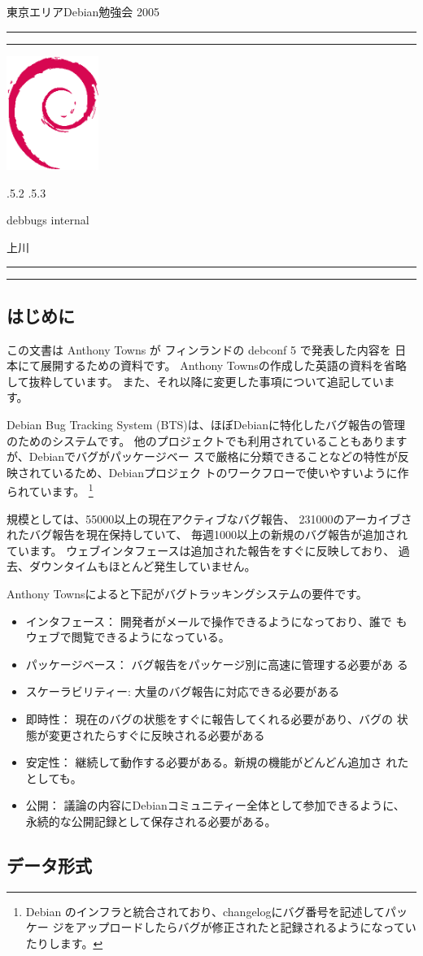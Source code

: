 \documentclass[mingoth,a4paper]{jsarticle}
\makeatletter
\renewcommand{\section}{\@startsection{section}{1}{\z@}%
    {\Cvs \@plus.5\Cdp \@minus.2\Cdp}%
    {.5\Cvs \@plus.3\Cdp}%
    {\normalfont\Large\headfont\raggedright\centering}} %
\newcommand{\dancersection}[2]{%
\newpage
東京エリアDebian勉強会 2005
\hrule
\vspace{0.5mm}
\hrule
\hfill{}\includegraphics[width=3cm]{image200502/openlogo-nd.eps}\\
\vspace{-4cm}
\begin{center}
  \section{#1}
\end{center}
\hfill{}#2\hspace{3cm}\space\\
\hrule
\hrule
\vspace{1cm}
}
\makeatother
\begin{document}

\dancersection{debbugs internal}{上川}
\label{sec:uekawa}
\subsection{はじめに}

この文書は Anthony Towns が フィンランドの debconf 5 で発表した内容を
日本にて展開するための資料です。
Anthony Townsの作成した英語の資料を省略して抜粋しています。
また、それ以降に変更した事項について追記しています。

Debian Bug Tracking System (BTS)は、ほぼDebianに特化したバグ報告の管理
のためのシステムです。
他のプロジェクトでも利用されていることもありますが、Debianでバグがパッケージベー
スで厳格に分類できることなどの特性が反映されているため、Debianプロジェク
トのワークフローで使いやすいように作られています。
\footnote{Debian のインフラと統合されており、changelogにバグ番号を記述してパッケー
ジをアップロードしたらバグが修正されたと記録されるようになっていたりします。}

規模としては、55000以上の現在アクティブなバグ報告、
231000のアーカイブされたバグ報告を現在保持していて、
毎週1000以上の新規のバグ報告が追加されています。
ウェブインタフェースは追加された報告をすぐに反映しており、
過去、ダウンタイムもほとんど発生していません。

Anthony Townsによると下記がバグトラッキングシステムの要件です。

\begin{itemize}
 \item インタフェース： 開発者がメールで操作できるようになっており、誰で
       もウェブで閲覧できるようになっている。
 \item パッケージベース： バグ報告をパッケージ別に高速に管理する必要があ
       る
 \item スケーラビリティー: 大量のバグ報告に対応できる必要がある
 \item 即時性： 現在のバグの状態をすぐに報告してくれる必要があり、バグの
       状態が変更されたらすぐに反映される必要がある
 \item 安定性： 継続して動作する必要がある。新規の機能がどんどん追加さ
       れたとしても。
 \item 公開： 議論の内容にDebianコミュニティー全体として参加できるように、
       永続的な公開記録として保存される必要がある。
\end{itemize}

\subsection{データ形式}
\end{document}
